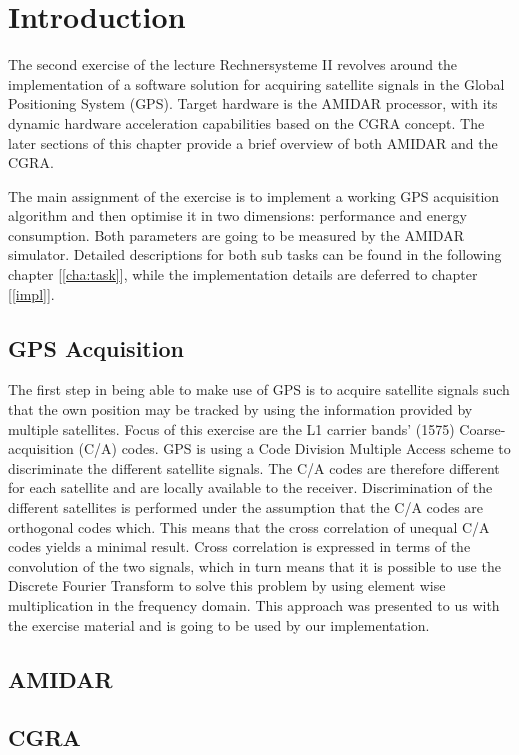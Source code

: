 \chapter{Introduction}
\label{cha:intro}
	The second exercise of the lecture Rechnersysteme II revolves around the implementation of a software solution for acquiring satellite signals in the Global Positioning System (GPS). Target hardware is the AMIDAR processor, with its dynamic hardware acceleration capabilities based on the CGRA concept. The later sections of this chapter provide a brief overview of both AMIDAR and the CGRA.

	The main assignment of the exercise is to implement a working GPS acquisition algorithm and then optimise it in two dimensions: performance and energy consumption. Both parameters are going to be measured by the AMIDAR simulator. Detailed descriptions for both sub tasks can be found in the following chapter [\ref{cha:task}], while the implementation details are deferred to chapter [\ref{impl}].

	\section{GPS Acquisition} %
	\label{sec:intro_acq}
		The first step in being able to make use of GPS is to acquire satellite signals such that the own position may be tracked by using the information provided by multiple satellites.
		Focus of this exercise are the L1 carrier bands' (\si{1575}\mega\herz) Coarse-acquisition (C/A) codes. GPS is using a Code Division Multiple Access scheme to discriminate the different satellite signals. The C/A codes are therefore different for each satellite and are locally available to the receiver. 
		Discrimination of the different satellites is performed under the assumption that the C/A codes are orthogonal codes which. This means that the cross correlation of unequal C/A codes yields a minimal result. Cross correlation is expressed in terms of the convolution of the two signals, which in turn means that it is possible to use the Discrete Fourier Transform to solve this problem by using element wise multiplication in the frequency domain. This approach was presented to us with the exercise material and is going to be used by our implementation.

	\section{AMIDAR} %
	\label{sec:intro_amidar}


	\section{CGRA} %
	\label{sec:intro_cgra}


